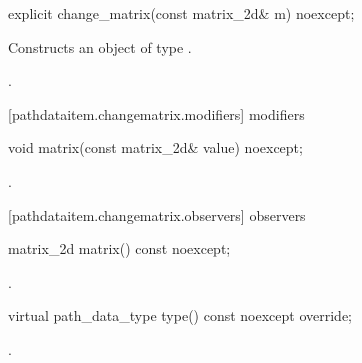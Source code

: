\begin{itemdecl}
    explicit change_matrix(const matrix_2d& m) noexcept;
\end{itemdecl}
\begin{itemdescr}
	\pnum
	\effects
	Constructs an object of type .
	
	\pnum
	\postconditions
	.
\end{itemdescr}

 [pathdataitem.changematrix.modifiers]{ modifiers}

\begin{itemdecl}
    void matrix(const matrix_2d& value) noexcept;
\end{itemdecl}
\begin{itemdescr}
	\pnum
	\postconditions
	.
\end{itemdescr}

 [pathdataitem.changematrix.observers]{ observers}

\begin{itemdecl}
    matrix_2d matrix() const noexcept;
\end{itemdecl}
\begin{itemdescr}
	\pnum
	\returns
	.
\end{itemdescr}

\begin{itemdecl}
    virtual path_data_type type() const noexcept override;
\end{itemdecl}
\begin{itemdescr}
	\pnum
	\returns
	.
\end{itemdescr}
